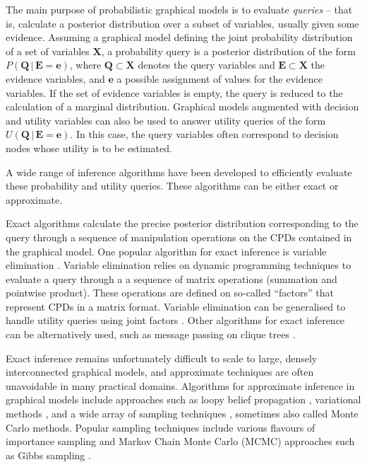 The main purpose of probabilistic graphical models is to evaluate \textit{queries} -- that is, calculate a posterior distribution over a subset of variables, usually given some evidence. Assuming a graphical model defining the joint probability distribution of a set of variables $\mathbf{X}$, a probability query is a posterior distribution of the form $P(\mathbf{Q}  \, | \,  \mathbf{E}\!=\!\mathbf{e})$, where $\mathbf{Q} \subset \mathbf{X}$ denotes the query variables and $\mathbf{E} \subset \mathbf{X}$ the evidence variables, and $\mathbf{e}$ a possible assignment of values for the evidence variables.  If the set of evidence variables is empty, the query is reduced to the calculation of a marginal distribution.  Graphical models augmented with decision and utility variables can also be used to answer utility queries of the form $U(\mathbf{Q}   \, | \,  \mathbf{E}\!=\!\mathbf{e})$.  In this case, the query variables often correspond to decision nodes whose utility is to be estimated.

A wide range of inference algorithms have been developed to efficiently evaluate these probability and utility queries. These algorithms can be either exact or approximate.  

Exact algorithms calculate the precise posterior distribution corresponding to the query through a sequence of manipulation operations on the CPDs contained in the graphical model.  One popular algorithm for exact inference is variable elimination \citep{ZhangP96}.  Variable elimination relies on dynamic programming techniques to evaluate a query through a a sequence of matrix operations (summation and pointwise product). These operations are defined on so-called ``factors'' that represent CPDs in a matrix format. Variable elimination can be generalised to handle utility queries using joint factors \citep{Koller+Friedman:09}.   Other algorithms for exact inference can be alternatively used, such as message passing on clique trees \citep{jensen1990}. 

Exact inference remains unfortunately difficult to scale to large, densely interconnected graphical models, and  approximate techniques are often unavoidable in many practical domains.  Algorithms for approximate inference in graphical models include approaches such as loopy belief propagation \citep{Murphy:1999}, variational methods \citep{Jordan:1999},  and a wide array of sampling techniques \citep{mackay1998introduction}, sometimes also called Monte Carlo methods. Popular sampling techniques include various flavours of importance sampling \citep{FungC89,cheng2000ais} and Markov Chain Monte Carlo (MCMC) approaches such as Gibbs sampling \citep{pearl1987evidential,gamerman2006markov}. %

